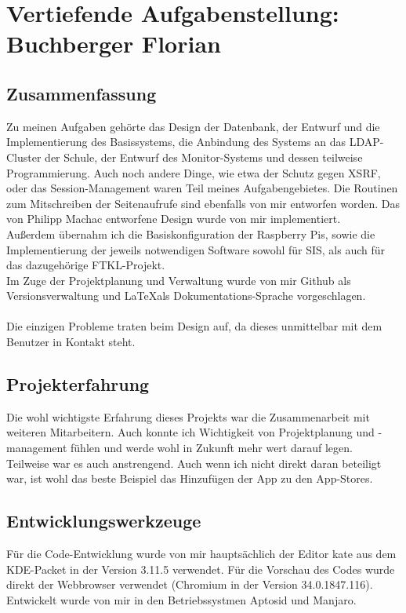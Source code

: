 \chapter[Buchberger]{Vertiefende Aufgabenstellung:\\Buchberger Florian}

\section{Zusammenfassung}
Zu meinen Aufgaben gehörte das Design der Datenbank, der Entwurf und die Implementierung des Basissystems, die Anbindung des Systems an das LDAP-Cluster der Schule, der Entwurf des Monitor-Systems und dessen teilweise Programmierung. Auch noch andere Dinge, wie etwa der Schutz gegen XSRF, oder das Session-Management waren Teil meines Aufgabengebietes. Die Routinen zum Mitschreiben der Seitenaufrufe sind ebenfalls von mir entworfen worden. Das von Philipp Machac entworfene Design wurde von mir implementiert.\\
Außerdem übernahm ich die Basiskonfiguration der Raspberry Pis, sowie die Implementierung der jeweils notwendigen Software sowohl für SIS, als auch für das dazugehörige FTKL-Projekt.\\
Im Zuge der Projektplanung und Verwaltung wurde von mir Github als Versionsverwaltung und \LaTeX  als Dokumentations-Sprache vorgeschlagen.\\
\\
Die einzigen Probleme traten beim Design auf, da dieses unmittelbar mit dem Benutzer in Kontakt steht.
\section{Projekterfahrung}
Die wohl wichtigste Erfahrung dieses Projekts war die Zusammenarbeit mit weiteren Mitarbeitern. Auch konnte ich Wichtigkeit von Projektplanung und -management fühlen und werde wohl in Zukunft mehr wert darauf legen.\\
Teilweise war es auch anstrengend. Auch wenn ich nicht direkt daran beteiligt war, ist wohl das beste Beispiel das Hinzufügen der App zu den App-Stores.

\section{Entwicklungswerkzeuge}
Für die Code-Entwicklung wurde von mir hauptsächlich der Editor kate aus dem KDE-Packet in der Version 3.11.5 verwendet. Für die Vorschau des Codes wurde direkt der Webbrowser verwendet (Chromium in der Version 34.0.1847.116).\\
Entwickelt wurde von mir in den Betriebssystmen Aptosid und Manjaro.

